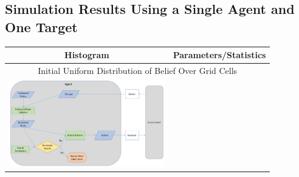 \subsection{Simulation Results Using a Single Agent and One Target}\label{subsec:SingleAgentSingleSourceResults}


\begin{landscape}
\centering
\vspace*{\fill}
\begin{table}[h!]
  \centering
  \begin{tabular}{ | c | c | }
    \hline
    Histogram & Parameters/Statistics \\
    \hline
     \multicolumn{2}{c}{Initial Uniform Distribution of Belief Over Grid Cells}\\
    \hline
    \begin{minipage}[c][40mm][c]{.45\textwidth}
      \includegraphics[width=\linewidth, height=38mm]{Chapters/MultiAgentTargetDetection/Figs/AgentFnArchitecture/BasicAgentFunctionNoCommunication.PNG}


\end{minipage}
\end{tabular}
\end{table}
\end{landscape}
